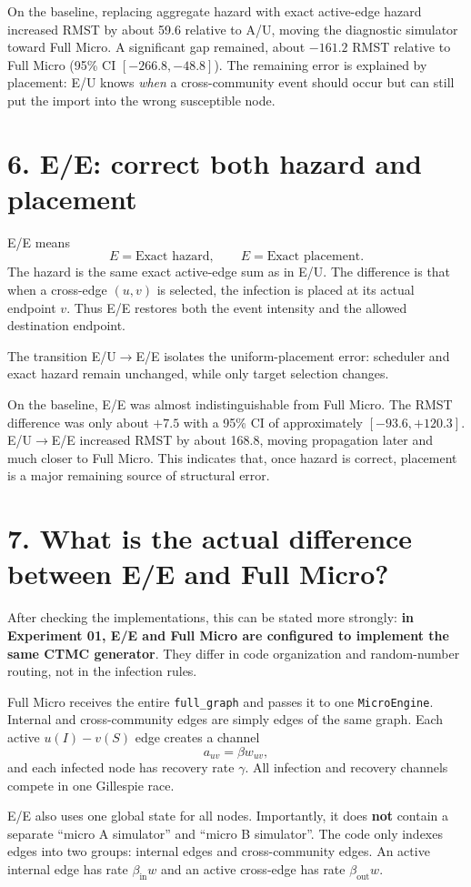 \documentclass[11pt,a4paper]{article}
\begin{document}
On the baseline, replacing aggregate hazard with exact active-edge hazard increased RMST by about 59.6 relative to A/U, moving the diagnostic simulator toward Full Micro. A significant gap remained, about $-161.2$ RMST relative to Full Micro (95\% CI $[-266.8,-48.8]$). The remaining error is explained by placement: E/U knows \emph{when} a cross-community event should occur but can still put the import into the wrong susceptible node.

\section*{6. E/E: correct both hazard and placement}
E/E means
\[
E=\text{Exact hazard},\qquad E=\text{Exact placement}.
\]
The hazard is the same exact active-edge sum as in E/U. The difference is that when a cross-edge $(u,v)$ is selected, the infection is placed at its actual endpoint $v$. Thus E/E restores both the event intensity and the allowed destination endpoint.

The transition E/U$\to$E/E isolates the uniform-placement error: scheduler and exact hazard remain unchanged, while only target selection changes.

On the baseline, E/E was almost indistinguishable from Full Micro. The RMST difference was only about $+7.5$ with a 95\% CI of approximately $[-93.6,+120.3]$. E/U$\to$E/E increased RMST by about 168.8, moving propagation later and much closer to Full Micro. This indicates that, once hazard is correct, placement is a major remaining source of structural error.

\section*{7. What is the actual difference between E/E and Full Micro?}
After checking the implementations, this can be stated more strongly: \textbf{in Experiment 01, E/E and Full Micro are configured to implement the same CTMC generator}. They differ in code organization and random-number routing, not in the infection rules.

Full Micro receives the entire \texttt{full\_graph} and passes it to one \texttt{MicroEngine}. Internal and cross-community edges are simply edges of the same graph. Each active $u(I)-v(S)$ edge creates a channel
\[
a_{uv}=\beta w_{uv},
\]
and each infected node has recovery rate $\gamma$. All infection and recovery channels compete in one Gillespie race.

E/E also uses one global state for all nodes. Importantly, it does \textbf{not} contain a separate ``micro A simulator'' and ``micro B simulator''. The code only indexes edges into two groups: internal edges and cross-community edges. An active internal edge has rate $\beta_{\mathrm{in}}w$ and an active cross-edge has rate $\beta_{\mathrm{out}}w$.
\end{document}
